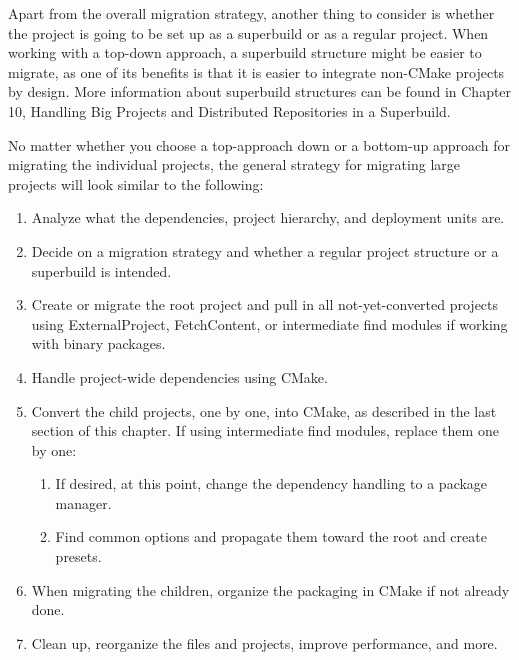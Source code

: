 Apart from the overall migration strategy, another thing to consider is whether the project is going to be set up as a superbuild or as a regular project. When working with a top-down approach, a superbuild structure might be easier to migrate, as one of its benefits is that it is easier to integrate non-CMake projects by design. More information about superbuild structures can be found in Chapter 10, Handling Big Projects and Distributed Repositories in a Superbuild.

No matter whether you choose a top-approach down or a bottom-up approach for migrating the individual projects, the general strategy for migrating large projects will look similar to the following:

\begin{enumerate}
\item 
Analyze what the dependencies, project hierarchy, and deployment units are.

\item 
Decide on a migration strategy and whether a regular project structure or a superbuild is intended.

\item 
Create or migrate the root project and pull in all not-yet-converted projects using ExternalProject, FetchContent, or intermediate find modules if working with binary packages.

\item
Handle project-wide dependencies using CMake.

\item
Convert the child projects, one by one, into CMake, as described in the last section
of this chapter. If using intermediate find modules, replace them one by one:

\begin{enumerate}[label=\roman*]
\item
If desired, at this point, change the dependency handling to a package manager.

\item
Find common options and propagate them toward the root and create presets.
\end{enumerate}

\item
When migrating the children, organize the packaging in CMake if not already done.

\item
Clean up, reorganize the files and projects, improve performance, and more.
\end{enumerate}


